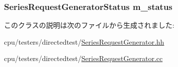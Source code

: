\label{classSeriesRequestGenerator_a4b4ba0e6f69baeee00bc034b2403dab9}
\hypertarget{classSeriesRequestGenerator_a2ecf6f10d4a6a20990ac439e3d0cab30}{
\subsubsection[{m\_\-status}]{\setlength{\rightskip}{0pt plus 5cm}SeriesRequestGeneratorStatus {\bf m\_\-status}}}
\label{classSeriesRequestGenerator_a2ecf6f10d4a6a20990ac439e3d0cab30}


このクラスの説明は次のファイルから生成されました:\begin{DoxyCompactItemize}
\item 
cpu/testers/directedtest/\hyperlink{SeriesRequestGenerator_8hh}{SeriesRequestGenerator.hh}\item 
cpu/testers/directedtest/\hyperlink{SeriesRequestGenerator_8cc}{SeriesRequestGenerator.cc}\end{DoxyCompactItemize}
